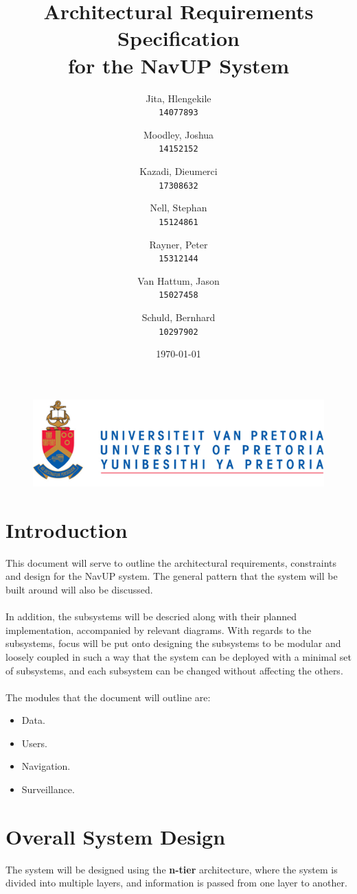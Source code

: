 \documentclass[english]{article}
\author{
	Jita, Hlengekile\\
	\texttt{14077893}
	\and
	Moodley, Joshua\\
	\texttt{14152152}
	\and
	Kazadi, Dieumerci\\
	\texttt{17308632}
	\and
	Nell, Stephan\\
	\texttt{15124861}
	\and
	Rayner, Peter\\
	\texttt{15312144}
	\and
	Van Hattum, Jason\\
	\texttt{15027458}
	\and
	Schuld, Bernhard\\
	\texttt{10297902}
}
\title{Architectural Requirements Specification\\
	for the NavUP System\\
	}
\date{\today}
\begin{document}
    \fboxsep=2mm

	\maketitle
	\begin{figure}[!t]
		\includegraphics{up_logo.png}
	\end{figure}
	\newpage

	\tableofcontents
	\newpage


	\section{Introduction}
		This document will serve to outline the architectural requirements, constraints and design for the NavUP system. The general pattern that the system will be built around will also be discussed.\\
        \\
		In addition, the subsystems will be descried along with their planned implementation, accompanied by relevant diagrams. With regards to the subsystems, focus will be put onto designing the subsystems to be modular and loosely coupled in such a way that the system can be deployed with a minimal set of subsystems, and each subsystem can be changed without affecting the others.\\
		\\
		The modules that the document will outline are:
		\begin{itemize}
		    \item Data.
		    \item Users.
		    \item Navigation.
		    \item Surveillance.
		\end{itemize}

	\section{Overall System Design}
	    The system will be designed using the \textbf{n-tier} architecture, where the system is divided into multiple layers, and information is passed from one layer to another.
\end{document}
